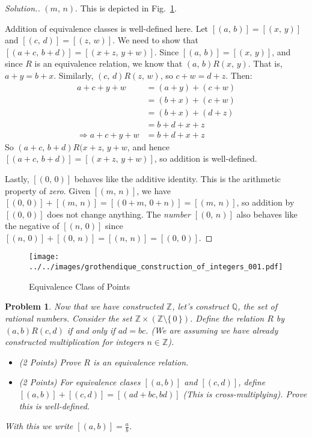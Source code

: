 \documentclass{article}
\theoremstyle{normal}
\newtheorem{problem}{Problem}
\begin{document}
\begin{proof}[Solution.]
        $(m,\,n)$. This is depicted in
        Fig.~\ref{fig:grothendique_construction_of_integers_001}.
        \par\hfill\par
        Addition of equivalence classes is well-defined here. Let
        $[(a,\,b)]=[(x,\,y)]$ and $[(c,\,d)]=[(z,\,w)]$. We need to show
        that $[(a+c,\,b+d)]=[(x+z,\,y+w)]$. Since $[(a,\,b)]=[(x,\,y)]$, and
        since $R$ is an equivalence relation, we know that
        $(a,\,b)R(x,\,y)$. That is, $a+y=b+x$. Similarly, $(c,\,d)R(z,\,w)$, so
        $c+w=d+z$. Then:
        \begin{align}
            a+c+y+w
            &=(a+y)+(c+w)\tag{Associativity and Commutativity}\\
            &=(b+x)+(c+w)\tag{Substitution}\\
            &=(b+x)+(d+z)\tag{Substituion}\\
            &=b+d+x+z\tag{Associativity and Commutativity}\\
            \Rightarrow
            a+c+y+w
            &=b+d+x+z\tag{Transitivity of Equality}
        \end{align}
        So $(a+c,\,b+d)R(x+z,\,y+w$, and hence
        $[(a+c,\,b+d)]=[(x+z,\,y+w)]$, so addition is well-defined.
        \par\hfill\par
        Lastly, $[(0,\,0)]$ behaves like the additive identity. This is the
        arithmetic property of \textit{zero}. Given $[(m,\,n)]$, we have
        $[(0,\,0)]+[(m,\,n)]=[(0+m,\,0+n)]=[(m,\,n)]$, so addition by
        $[(0,\,0)]$ does not change anything. The \textit{number}
        $[(0,\,n)]$ also behaves like the negative of $[(n,\,0)]$ since
        $[(n,\,0)]+[(0,\,n)]=[(n,\,n)]=[(0,\,0)]$.
    \end{proof}
    \begin{figure}
        \centering
        \texttt{[image: ../../images/grothendique\_construction\_of\_integers\_001.pdf]}
        \caption{Equivalence Class of Points}
        \label{fig:grothendique_construction_of_integers_001}
    \end{figure}
    \clearpage
    \color{blue}
    \begin{problem}
        Now that we have constructed $\mathbb{Z}$, let's construct $\mathbb{Q}$,
        the set of rational numbers. Consider the set
        $\mathbb{Z}\times(\mathbb{Z}\setminus\{\,0\,\})$. Define the relation
        $R$ by $(a,b)R(c,d)$ if and only if $ad=bc$. (We are assuming we have
        already constructed multiplication for integers $n\in\mathbb{Z}$).
        \begin{itemize}
            \item (2 Points) Prove $R$ is an equivalence relation.
            \item (2 Points) For equivalence clases $[(a,b)]$ and $[(c,d)]$,
                define $[(a,b)]+[(c,d)]=[(ad+bc,bd)]$ (This is
                \textit{cross-multiplying}). Prove this is well-defined.
        \end{itemize}
        With this we write $[(a,b)]=\frac{a}{b}$.
    \end{problem}
\end{document}
